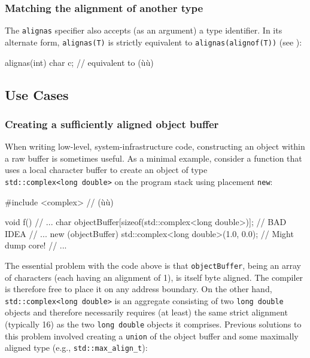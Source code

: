 \subsubsection[Matching the alignment of another type]{Matching the alignment of another type}\label{matching-the-alignment-of-another-type}

The \lstinline!alignas! specifier also accepts (as an argument) a type
identifier. In its alternate form, \lstinline!alignas(T)! is strictly
equivalent to \lstinline!alignas(alignof(T))! (see ):

\begin{emcppslisting}
alignas(int) char c;  // equivalent to (ù{}ù)
\end{emcppslisting}


\subsection[Use Cases]{Use Cases}\label{alignas-use-cases}

\subsubsection[Creating a sufficiently aligned object buffer]{Creating a sufficiently aligned object buffer}\label{creating-a-sufficiently-aligned-object-buffer}

When writing low-level, system-infrastructure code, constructing an object within a raw buffer is sometimes useful. As a minimal
example, consider a function that uses a local character buffer to
create an object of type \lstinline!std::complex<long!~\lstinline!double>! on
the program stack using placement \lstinline!new!:

\begin{emcppslisting}
#include <complex>  // (ù{}ù)

void f()
{
    // ...
    char objectBuffer[sizeof(std::complex<long double>)];    // BAD IDEA
    // ...
    new (objectBuffer) std::complex<long double>(1.0, 0.0);  // Might dump core!
    // ...
}
\end{emcppslisting}

\noindent The essential problem with the code above is that \lstinline!objectBuffer!,
being an array of characters (each having an alignment of 1), is itself
byte aligned. The compiler is therefore free to place it on any address
boundary. On the other hand, \lstinline!std::complex<long!~\lstinline!double>! is an aggregate consisting of two \lstinline!long!~\lstinline!double! objects
and therefore necessarily requires (at least) the same strict alignment
(typically 16) as the two \lstinline!long!~\lstinline!double! objects it comprises. Previous
solutions to this problem involved creating a \lstinline!union! of the
object buffer and some maximally aligned type (e.g.,
\lstinline!std::max_align_t!):

